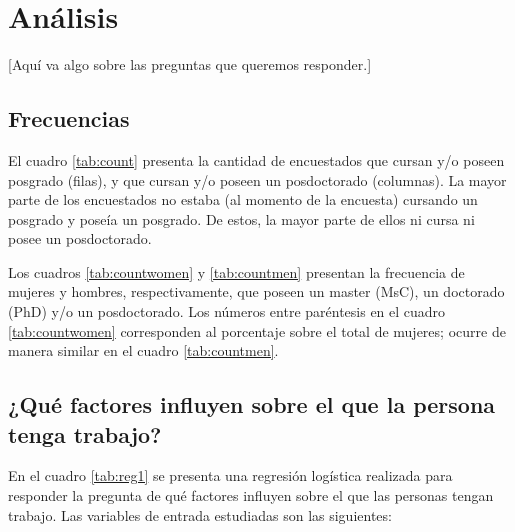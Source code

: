 \documentclass{article}
\begin{document}
\section{Análisis}

[Aquí va algo sobre las preguntas que queremos responder.]


\subsection{Frecuencias}

El cuadro \ref{tab:count} presenta la cantidad de encuestados que cursan y/o poseen posgrado (filas), y que cursan y/o poseen un posdoctorado (columnas). La mayor parte de los encuestados no estaba (al momento de la encuesta) cursando un posgrado y poseía un posgrado. De estos, la mayor parte de ellos ni cursa ni posee un posdoctorado.

Los cuadros \ref{tab:countwomen} y \ref{tab:countmen} presentan la frecuencia de mujeres y hombres, respectivamente, que poseen un master (MsC), un doctorado (PhD) y/o un posdoctorado. Los números entre paréntesis en el cuadro \ref{tab:countwomen} corresponden al porcentaje sobre el total de mujeres; ocurre de manera similar en el cuadro \ref{tab:countmen}.





\subsection{¿Qué factores influyen sobre el que la persona tenga trabajo?}


En el cuadro \ref{tab:reg1} se presenta una regresión logística realizada para responder la pregunta de qué factores influyen sobre el que las personas tengan trabajo. Las variables de entrada estudiadas son las siguientes:
\end{document}
